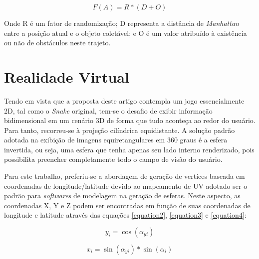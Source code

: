 \documentclass{SBCbookchapter}
\begin{document}
\begin{equation}
F(A) = R * (D + O)
\label{eq_fardo}
\end{equation}

Onde R é um fator de randomização; D representa a distância de \textit{Manhattan} entre a posição atual e o objeto coletável; e O é um valor atribuído à existência ou não de obstáculos neste trajeto.

\section{Realidade Virtual} \label{sec:invertedsphere}
Tendo em vista que a proposta deste artigo contempla um jogo essencialmente 2D, tal como o \textit{Snake} original, tem-se o desafio de exibir informação bidimensional em um cenário 3D de forma que tudo aconteça ao redor do usuário. Para tanto, recorreu-se à projeção cilíndrica equidistante. A solução padrão adotada na exibição de imagens equiretangulares em 360 graus é a esfera invertida, ou seja, uma esfera que tenha apenas seu lado interno renderizado, pois possibilita preencher completamente todo o campo de visão do usuário.

Para este trabalho, preferiu-se a abordagem de geração de vertíces baseada em coordenadas de longitude/latitude devido ao mapeamento de UV adotado ser o padrão para \textit{softwares} de modelagem na geração de esferas. Neste aspecto, as coordenadas X, Y e Z podem ser encontradas em função de suas coordenadas de longitude e latitude através das equações \ref{equation2}, \ref{equation3} e \ref{equation4}:

\begin{equation}
y_{i} = \cos(\alpha_{yi})
\label{equation2}
\end{equation}

\begin{equation}
x_{i} = \sin(\alpha_{yi}) * \sin(\alpha_i)
\label{equation3}
\end{equation}
\end{document}
